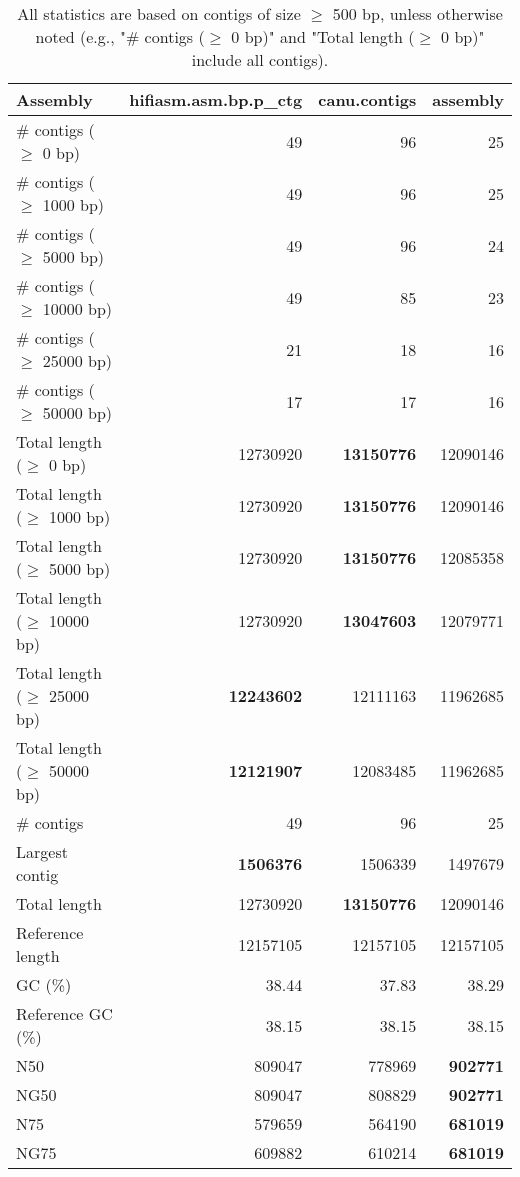 \documentclass[12pt,a4paper]{article}
\begin{document}
\begin{table}[ht]
\begin{center}
\caption{All statistics are based on contigs of size $\geq$ 500 bp, unless otherwise noted (e.g., "\# contigs ($\geq$ 0 bp)" and "Total length ($\geq$ 0 bp)" include all contigs).}
\begin{tabular}{|l*{3}{|r}|}
\hline
Assembly & hifiasm.asm.bp.p\_ctg & canu.contigs & assembly \\ \hline
\# contigs ($\geq$ 0 bp) & 49 & 96 & 25 \\ \hline
\# contigs ($\geq$ 1000 bp) & 49 & 96 & 25 \\ \hline
\# contigs ($\geq$ 5000 bp) & 49 & 96 & 24 \\ \hline
\# contigs ($\geq$ 10000 bp) & 49 & 85 & 23 \\ \hline
\# contigs ($\geq$ 25000 bp) & 21 & 18 & 16 \\ \hline
\# contigs ($\geq$ 50000 bp) & 17 & 17 & 16 \\ \hline
Total length ($\geq$ 0 bp) & 12730920 & {\bf 13150776} & 12090146 \\ \hline
Total length ($\geq$ 1000 bp) & 12730920 & {\bf 13150776} & 12090146 \\ \hline
Total length ($\geq$ 5000 bp) & 12730920 & {\bf 13150776} & 12085358 \\ \hline
Total length ($\geq$ 10000 bp) & 12730920 & {\bf 13047603} & 12079771 \\ \hline
Total length ($\geq$ 25000 bp) & {\bf 12243602} & 12111163 & 11962685 \\ \hline
Total length ($\geq$ 50000 bp) & {\bf 12121907} & 12083485 & 11962685 \\ \hline
\# contigs & 49 & 96 & 25 \\ \hline
Largest contig & {\bf 1506376} & 1506339 & 1497679 \\ \hline
Total length & 12730920 & {\bf 13150776} & 12090146 \\ \hline
Reference length & 12157105 & 12157105 & 12157105 \\ \hline
GC (\%) & 38.44 & 37.83 & 38.29 \\ \hline
Reference GC (\%) & 38.15 & 38.15 & 38.15 \\ \hline
N50 & 809047 & 778969 & {\bf 902771} \\ \hline
NG50 & 809047 & 808829 & {\bf 902771} \\ \hline
N75 & 579659 & 564190 & {\bf 681019} \\ \hline
NG75 & 609882 & 610214 & {\bf 681019} \\ \hline

\end{tabular}
\end{center}
\end{table}
\end{document}
